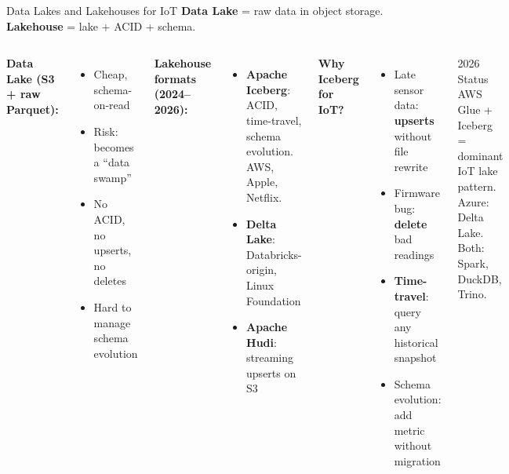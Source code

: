 \documentclass[aspectratio=169,11pt]{beamer}
\begin{document}
\begin{frame}{Data Lakes and Lakehouses for IoT}
    \small
    \textbf{Data Lake} = raw data in object storage. \textbf{Lakehouse} = lake + ACID + schema.

    \vspace{0.05cm}
    \begin{columns}
        \textbf{Data Lake (S3 + raw Parquet):}
        \begin{itemize}\setlength{\itemsep}{0pt}
            \item Cheap, schema-on-read
            \item Risk: becomes a ``data swamp''
            \item No ACID, no upserts, no deletes
            \item Hard to manage schema evolution
        \end{itemize}

        \vspace{0.05cm}
        \textbf{Lakehouse formats (2024--2026):}
        \begin{itemize}\setlength{\itemsep}{0pt}
            \item \textbf{Apache Iceberg}: ACID, time-travel, schema evolution. AWS, Apple, Netflix.
            \item \textbf{Delta Lake}: Databricks-origin, Linux Foundation
            \item \textbf{Apache Hudi}: streaming upserts on S3
        \end{itemize}

        \textbf{Why Iceberg for IoT?}
        \begin{itemize}\setlength{\itemsep}{0pt}
            \item Late sensor data: \textbf{upserts} without file rewrite
            \item Firmware bug: \textbf{delete} bad readings
            \item \textbf{Time-travel}: query any historical snapshot
            \item Schema evolution: add metric without migration
        \end{itemize}

        \vspace{0.05cm}
        \begin{exampleblock}{2026 Status}
            AWS Glue + Iceberg = dominant IoT lake pattern. Azure: Delta Lake. Both: Spark, DuckDB, Trino.
        \end{exampleblock}
    \end{columns}
\end{frame}
\end{document}
